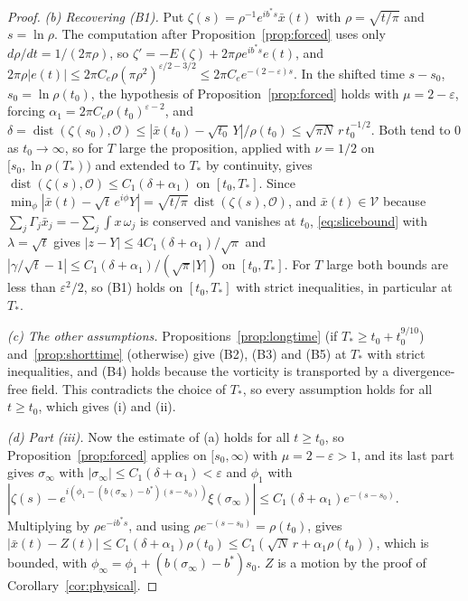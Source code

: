 \documentclass[11pt]{article}
\theoremstyle{definition}
\begin{document}
\begin{proof}
\emph{(b) Recovering (B1).} Put $\zeta(s) = \rho^{-1}e^{ib^*s}\bar x(t)$ with $\rho = \sqrt{t/\pi}$ and $s = \ln\rho$. The computation after Proposition~\ref{prop:forced} uses only $d\rho/dt = 1/(2\pi\rho)$, so $\zeta' = -E(\zeta) + 2\pi\rho e^{ib^*s}e(t)$, and $2\pi\rho|e(t)| \le 2\pi C_e\rho(\pi\rho^2)^{\varepsilon/2 - 3/2} \le 2\pi C_ee^{-(2 - \varepsilon)s}$. In the shifted time $s - s_0$, $s_0 = \ln\rho(t_0)$, the hypothesis of Proposition~\ref{prop:forced} holds with $\mu = 2 - \varepsilon$, forcing $\alpha_1 = 2\pi C_e\rho(t_0)^{\varepsilon - 2}$, and $\delta = \operatorname{dist}(\zeta(s_0), \mathcal O) \le |\bar x(t_0) - \sqrt{t_0}\,Y|/\rho(t_0) \le \sqrt{\pi N}\,r\,t_0^{-1/2}$. Both tend to $0$ as $t_0 \to \infty$, so for $T$ large the proposition, applied with $\nu = 1/2$ on $[s_0, \ln\rho(T_*))$ and extended to $T_*$ by continuity, gives $\operatorname{dist}(\zeta(s), \mathcal O) \le C_1(\delta + \alpha_1)$ on $[t_0, T_*]$. Since $\min_\phi|\bar x(t) - \sqrt t\,e^{i\phi}Y| = \sqrt{t/\pi}\,\operatorname{dist}(\zeta(s), \mathcal O)$, and $\bar x(t) \in \mathcal V$ because $\sum_j\Gamma_j\bar x_j = -\sum_j\int x\,\omega_j$ is conserved and vanishes at $t_0$, \eqref{eq:slicebound} with $\lambda = \sqrt t$ gives $|z - Y| \le 4C_1(\delta + \alpha_1)/\sqrt\pi$ and $|\gamma/\sqrt t - 1| \le C_1(\delta + \alpha_1)/(\sqrt\pi|Y|)$ on $[t_0, T_*]$. For $T$ large both bounds are less than $\varepsilon^2/2$, so (B1) holds on $[t_0, T_*]$ with strict inequalities, in particular at $T_*$.

\emph{(c) The other assumptions.} Propositions~\ref{prop:longtime} (if $T_* \ge t_0 + t_0^{9/10}$) and~\ref{prop:shorttime} (otherwise) give (B2), (B3) and (B5) at $T_*$ with strict inequalities, and (B4) holds because the vorticity is transported by a divergence-free field. This contradicts the choice of $T_*$, so every assumption holds for all $t \ge t_0$, which gives (i) and (ii).

\emph{(d) Part (iii).} Now the estimate of (a) holds for all $t \ge t_0$, so Proposition~\ref{prop:forced} applies on $[s_0, \infty)$ with $\mu = 2 - \varepsilon > 1$, and its last part gives $\sigma_\infty$ with $|\sigma_\infty| \le C_1(\delta + \alpha_1) < \varepsilon$ and $\phi_1$ with $|\zeta(s) - e^{i(\phi_1 - (b(\sigma_\infty) - b^*)(s - s_0))}\xi(\sigma_\infty)| \le C_1(\delta + \alpha_1)e^{-(s - s_0)}$. Multiplying by $\rho e^{-ib^*s}$, and using $\rho e^{-(s - s_0)} = \rho(t_0)$, gives $|\bar x(t) - Z(t)| \le C_1(\delta + \alpha_1)\rho(t_0) \le C_1(\sqrt N\,r + \alpha_1\rho(t_0))$, which is bounded, with $\phi_\infty = \phi_1 + (b(\sigma_\infty) - b^*)s_0$. $Z$ is a motion by the proof of Corollary~\ref{cor:physical}.
\end{proof}
\end{document}
